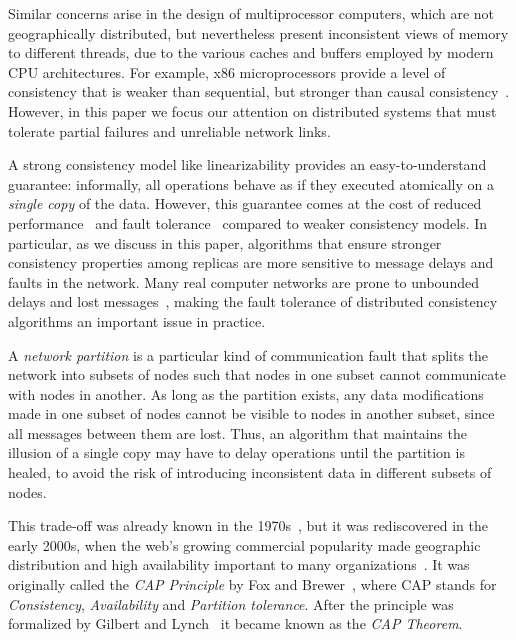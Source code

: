\documentclass[a4paper,twocolumn,10pt]{article}
\begin{document}
Similar concerns arise in the design of multiprocessor computers, which are not geographically
distributed, but nevertheless present inconsistent views of memory to different threads, due to the
various caches and buffers employed by modern CPU architectures. For example, x86 microprocessors
provide a level of consistency that is weaker than sequential, but stronger than causal
consistency~\cite{Sewell2010fj}. However, in this paper we focus our attention on distributed
systems that must tolerate partial failures and unreliable network links.

A strong consistency model like linearizability provides an easy-to-understand guarantee:
informally, all operations behave as if they executed atomically on a \emph{single copy} of the
data. However, this guarantee comes at the cost of reduced performance~\cite{Attiya1994gw} and fault
tolerance~\cite{Davidson1985hv} compared to weaker consistency models. In particular, as we discuss
in this paper, algorithms that ensure stronger consistency properties among replicas are more
sensitive to message delays and faults in the network. Many real computer networks are prone to
unbounded delays and lost messages~\cite{Bailis2014jx}, making the fault tolerance of distributed
consistency algorithms an important issue in practice.

A \emph{network partition} is a particular kind of communication fault that splits the network into
subsets of nodes such that nodes in one subset cannot communicate with nodes in another. As long as
the partition exists, any data modifications made in one subset of nodes cannot be visible to nodes
in another subset, since all messages between them are lost. Thus, an algorithm that maintains the
illusion of a single copy may have to delay operations until the partition is healed, to avoid the
risk of introducing inconsistent data in different subsets of nodes.

This trade-off was already known in the
1970s~\cite{Johnson1975we, Lindsay1979wv, Fischer1982hc, Davidson1985hv},
but it was rediscovered in the early
2000s, when the web's growing commercial popularity made geographic distribution and high
availability important to many organizations~\cite{Brewer2012tr, Vogels2008ey}. It was originally
called the \emph{CAP Principle} by Fox and Brewer~\cite{Fox1999bs, Brewer2000vd}, where CAP stands
for \emph{Consistency}, \emph{Availability} and \emph{Partition tolerance}. After the principle was
formalized by Gilbert and Lynch~\cite{Gilbert2002il, Gilbert2012bf} it became known as the
\emph{CAP Theorem}.
\end{document}
